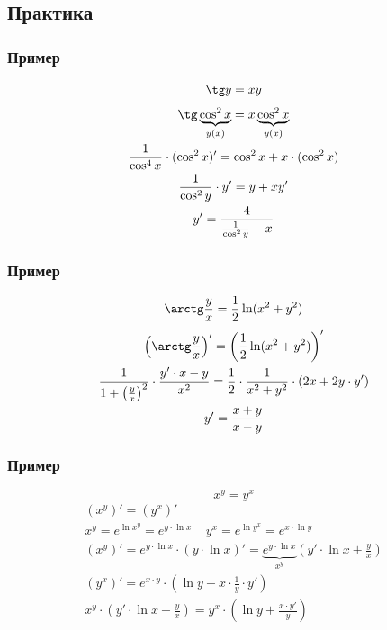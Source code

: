 \documentclass{article}
\begin{document}
\subsection{Практика}

\subsubsection{Пример}
\[
    \tg y = xy
\]
\begin{gather*}
    \tg \underbrace{\cos^2 x}_{y(x)} = x \underbrace{\cos^2 x}_{y(x)} \\
    \frac{1}{\cos^4 x} \cdot (\cos^2 x)' = \cos^2 x + x \cdot (\cos^2 x) \\
    \frac{1}{\cos^2 y} \cdot y' = y + xy' \\
    y' = \frac{4}{\frac{1}{\cos^2 y} - x}
\end{gather*}

\subsubsection{Пример}
\[
    \arctg \frac{y}{x} = \frac{1}{2} \ln(x^2 + y^2)
\]
\begin{gather*}
    \left( \arctg \frac{y}{x} \right)' = \left( \frac{1}{2} \ln(x^2 + y^2) \right)' \\
    \frac{1}{1 + \left( \frac{y}{x} \right)^2} \cdot \frac{y' \cdot x - y}{x^2} =
    \frac{1}{2} \cdot \frac{1}{x^2 + y^2} \cdot (2x + 2y \cdot y') \\
    y' = \frac{x + y}{x - y}
\end{gather*}

\subsubsection{Пример}
\[
    x^y = y^x
\]
\begin{gather*}
    (x^y)' = (y^x)' \\
    x^y = e^{\ln x^y} = e^{y \cdot \ln x} ~~~~~ y^x = e^{\ln y^x} = e^{x \cdot \ln y} \\
    (x^y)' = e^{y \cdot \ln x} \cdot (y \cdot \ln x)' =
    \underbrace{e^{y \cdot \ln x}}_{x^y} \left( y' \cdot \ln x + \frac{y}{x} \right) \\
    (y^x)' = e^{x \cdot y} \cdot \left( \ln y + x \cdot \frac{1}{y} \cdot y' \right) \\
    x^y \cdot \left( y' \cdot \ln x + \frac{y}{x} \right) = 
    y^x \cdot \left( \ln y + \frac{x \cdot y'}{y} \right)
\end{gather*}
\end{document}

